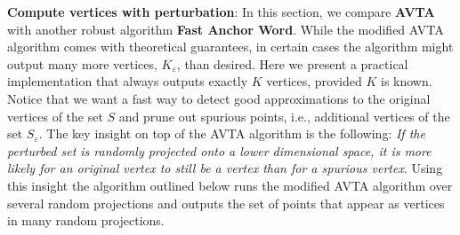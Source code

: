 \documentclass[]{article}
\begin{document}
	\noindent\textbf{Compute vertices with perturbation}:
	In this section, we compare \textbf{AVTA} with another robust algorithm \textbf{Fast Anchor Word}. 
	While the modified AVTA algorithm comes with theoretical guarantees, in certain cases the algorithm might output many more vertices, $K_\varepsilon$, than desired. Here we present a practical implementation that always outputs exactly $K$ vertices, provided $K$ is known. Notice that we want a fast way to detect good approximations to the original vertices of the set $S$ and prune out spurious points, i.e., additional vertices of the set $S_\varepsilon$. The key insight on top of the AVTA algorithm is the following: {\em If the perturbed set is randomly projected onto a lower dimensional space, it is more likely for an original vertex to still be a vertex than for a spurious vertex}. Using this insight the algorithm outlined below runs the modified AVTA algorithm over several random projections and outputs the set of points that appear as vertices in many random projections. 
	
	
	\begin{center}
	\end{center}
	
\end{document}
